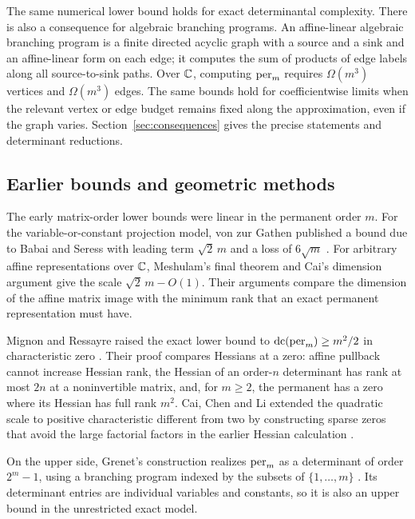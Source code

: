 The same numerical lower bound holds for exact determinantal complexity.
There is also a consequence for algebraic branching programs. An
affine-linear algebraic branching program is a finite directed acyclic
graph with a source and a sink and an affine-linear form on each edge; it
computes the sum of products of edge labels along all source-to-sink paths.
Over $\mathbb C$, computing $\operatorname{per}_m$ requires $\Omega(m^3)$ vertices and
$\Omega(m^3)$ edges. The same bounds hold for coefficientwise limits when
the relevant vertex or edge budget remains fixed along the approximation,
even if the graph varies. Section~\ref{sec:consequences} gives the precise
statements and determinant reductions.

\subsection{Earlier bounds and geometric methods}

The early matrix-order lower bounds were linear in the permanent order $m$.
For the variable-or-constant projection model, von zur Gathen published a
bound due to Babai and Seress with leading term $\sqrt{2}\,m$ and a loss of
$6\sqrt m$ \cite[Theorem~4.4]{vonZurGathen1987}. For arbitrary affine
representations over $\mathbb C$, Meshulam's final theorem
\cite[pp.~270--271]{Meshulam1989} and Cai's dimension argument
\cite[Theorem~1.5 and Section~2.2]{Cai1990} give the scale
$\sqrt{2}\,m-O(1)$. Their arguments compare the dimension of the affine
matrix image with the minimum rank that an exact permanent representation
must have.

Mignon and Ressayre raised the exact lower bound to
$\operatorname{dc}(\operatorname{per}_m)\ge m^2/2$ in characteristic zero
\cite{MignonRessayre2004}. Their proof compares Hessians at a zero:
affine pullback cannot increase Hessian rank, the Hessian of an order-$n$
determinant has rank at most $2n$ at a noninvertible matrix, and, for
$m\ge2$, the permanent has a zero where its Hessian has full rank $m^2$.
Cai, Chen and Li extended the quadratic scale to positive characteristic
different from two by constructing sparse zeros that avoid the large
factorial factors in the earlier Hessian calculation
\cite[Theorem~2.3]{CaiChenLi2010}.

On the upper side, Grenet's construction realizes $\operatorname{per}_m$ as a determinant
of order $2^m-1$, using a branching program indexed by the subsets of
$\{1,\ldots,m\}$ \cite[unnumbered Theorem, p.~3]{Grenet2012}.
Its determinant entries are individual variables and constants, so it is
also an upper bound in the unrestricted exact model.

